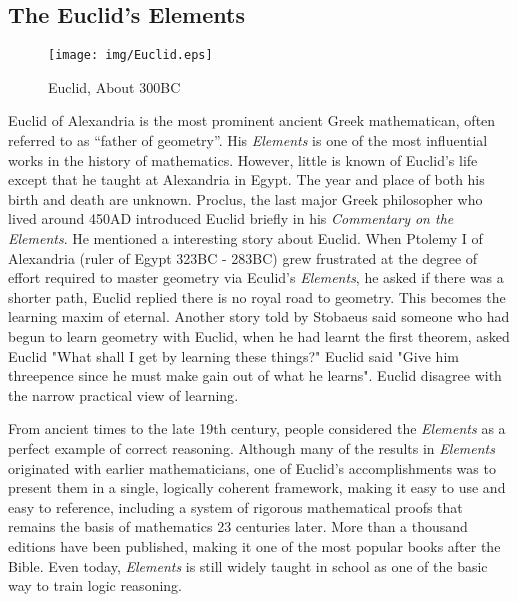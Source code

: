 \documentclass{article}
\begin{document}
\subsection{The Euclid's Elements}

\begin{wrapfigure}{R}{0.4\textwidth}
 \centering
 \texttt{[image: img/Euclid.eps]}
 \captionsetup{labelformat=empty}
 \caption{Euclid, About 300BC}
 \label{fig:Euclid}
\end{wrapfigure}

Euclid of Alexandria is the most prominent ancient Greek mathematican, often referred to as ``father of geometry''. His {\em Elements} is one of the most influential works in the history of mathematics. However, little is known of Euclid's life except that he taught at Alexandria in Egypt. The year and place of both his birth and death are unknown. Proclus, the last major Greek philosopher who lived around 450AD introduced Euclid briefly in his {\em Commentary on the Elements}. He mentioned a interesting story about Euclid. When Ptolemy I of Alexandria (ruler of Egypt 323BC - 283BC) grew frustrated at the degree of effort required to master geometry via Eculid's {\em Elements}, he asked if there was a shorter path, Euclid replied there is no royal road to geometry. This becomes the learning maxim of eternal. Another story told by Stobaeus said someone who had begun to learn geometry with Euclid, when he had learnt the first theorem, asked Euclid "What shall I get by learning these things?" Euclid said "Give him threepence since he must make gain out of what he learns". Euclid disagree with the narrow practical view of learning\cite{Elements}.

From ancient times to the late 19th century, people considered the {\em Elements} as a perfect example of correct reasoning. Although many of the results in {\em Elements} originated with earlier mathematicians, one of Euclid's accomplishments was to present them in a single, logically coherent framework, making it easy to use and easy to reference, including a system of rigorous mathematical proofs that remains the basis of mathematics 23 centuries later. More than a thousand editions have been published, making it one of the most popular books after the Bible. Even today, {\em Elements} is still widely taught in school as one of the basic way to train logic reasoning\cite{HanXueTao16}.
\end{document}
